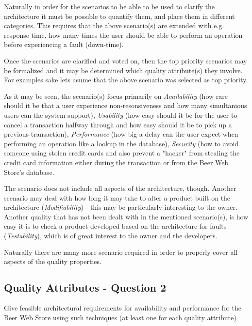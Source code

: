 Naturally in order for the scenarios to be able to be used to clarify the architecture it must be possible to quantify them, and place them in different categories. This requires that the above scenario(s) are extended with e.g. response time, how many times the user should be able to perform an operation before experiencing a fault (down-time). 

Once the scenarios are clarified and voted on, then the top priority scenarios may be formalized and it may be determined which quality attribute(s) they involve. For examples sake lets asume that the above scenario was selected as top priority.

As it may be seen, the scenario(s) focus primarily on \emph{Availability} (how rare should it be that a user experience non-resonsiveness and how many simultanious users can the system support), \emph{Usability} (how easy should it be for the user to cancel a transaction halfway through and how easy should it be to pick up a previous transaction), \emph{Performance} (how big a delay can the user expect when performing an operation like a lookup in the database), \emph{Security} (how to avoid someone using stolen credit cards and also prevent a "hacker" from stealing the credit card information either during the transaction or from the Beer Web Store's database.

The scenario does not include all aspects of the architecture, though. Another scenario may deal with how long it may take to alter a product built on the architecture (\emph{Modifiability}) - this may be particularly interesting to the owner. Another quality that has not been dealt with in the mentioned scenario(s), is how easy it is to check a product developed based on the architecture for faults (\emph{Testability}), which is of great interest to the owner and the developers.

Naturally there are many more scenario required in order to properly cover all aspects of the quality properties. 

\subsection{Quality Attributes - Question 2}

\begin{question}
Give feasible architectural requirements for availability
and performance for the Beer Web Store using such techniques (at
least one for each quality attribute)
\end{question}

